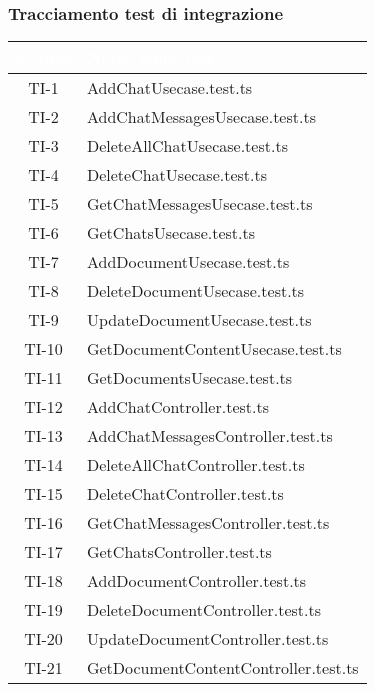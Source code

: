\subsubsection{Tracciamento test di integrazione}

\begingroup
\setlength{\tabcolsep}{10pt}
\renewcommand{\arraystretch}{1.5}
\begin{xltabular}{0.7\textwidth}{| c | X |}
    \hline
     \textbf{\textcolor{white}{Codice}} & \textbf{\textcolor{white}{Nome suite test}} \\
    \hline
    \endhead
    TI-1 & AddChatUsecase.test.ts \\
    \hline
    TI-2 & AddChatMessagesUsecase.test.ts \\
    \hline
    TI-3 & DeleteAllChatUsecase.test.ts \\
    \hline
    TI-4 & DeleteChatUsecase.test.ts \\
    \hline
    TI-5 & GetChatMessagesUsecase.test.ts \\
    \hline
    TI-6 & GetChatsUsecase.test.ts \\
    \hline
    TI-7 & AddDocumentUsecase.test.ts \\
    \hline
    TI-8 & DeleteDocumentUsecase.test.ts \\
    \hline
    TI-9 & UpdateDocumentUsecase.test.ts \\
    \hline
    TI-10 & GetDocumentContentUsecase.test.ts \\
    \hline
    TI-11 & GetDocumentsUsecase.test.ts \\
    \hline
    TI-12 & AddChatController.test.ts \\
    \hline
    TI-13 & AddChatMessagesController.test.ts \\
    \hline
    TI-14 & DeleteAllChatController.test.ts \\
    \hline
    TI-15 & DeleteChatController.test.ts \\
    \hline
    TI-16 & GetChatMessagesController.test.ts \\
    \hline
    TI-17 & GetChatsController.test.ts \\
    \hline
    TI-18 & AddDocumentController.test.ts \\
    \hline
    TI-19 & DeleteDocumentController.test.ts \\
    \hline
    TI-20 & UpdateDocumentController.test.ts \\
    \hline
    TI-21 & GetDocumentContentController.test.ts \\

\end{xltabular}
